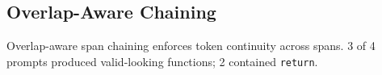 \subsection{Overlap-Aware Chaining}
Overlap-aware span chaining enforces token continuity across spans.
3 of 4 prompts produced valid-looking functions; 2 contained \texttt{return}.
